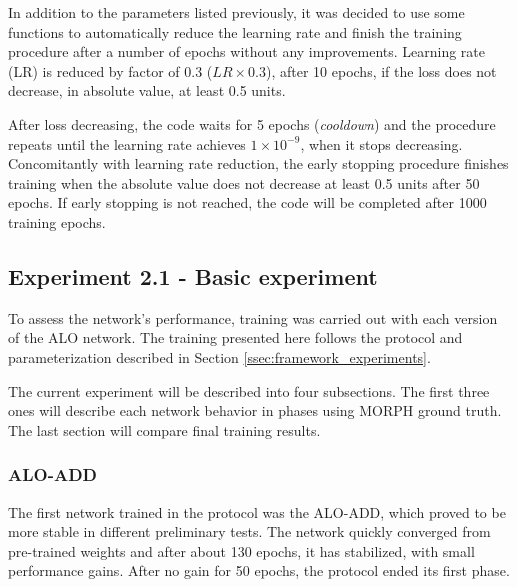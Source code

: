 In addition to the parameters listed previously, it was decided to use some functions to automatically reduce the learning rate and finish the training procedure after a number of epochs without any improvements. 
Learning rate (LR) is reduced by factor of 0.3 ($LR \times 0.3$), after 10 epochs, if the loss does not decrease, in absolute value, at least 0.5 units.

After loss decreasing, the code waits for 5 epochs (\textit{cooldown}) and the procedure repeats until the learning rate achieves $1 \times 10^{-9}$, when it stops decreasing.
Concomitantly with learning rate reduction, the early stopping procedure finishes training when the absolute value does not decrease at least 0.5 units after 50 epochs.
If early stopping is not reached, the code will be completed after 1000 training epochs.

\subsection{Experiment 2.1 - Basic experiment}
\label{ssec:bsds_subexp1}

To assess the network's performance, training was carried out with each version of the ALO network.
The training presented here follows the protocol and parameterization described in Section \ref{ssec:framework_experiments}.

The current experiment will be described into four subsections.
The first three ones will describe each network behavior in phases using MORPH ground truth.
The last section will compare final training results.

\subsubsection{ALO-ADD}
\label{ssec:bsds_subexp1_add}

The first network trained in the protocol was the ALO-ADD, which proved to be more stable in different preliminary tests.
The network quickly converged from pre-trained weights and after about 130 epochs, it has stabilized, with small performance gains.
After no gain for 50 epochs, the protocol ended its first phase.


